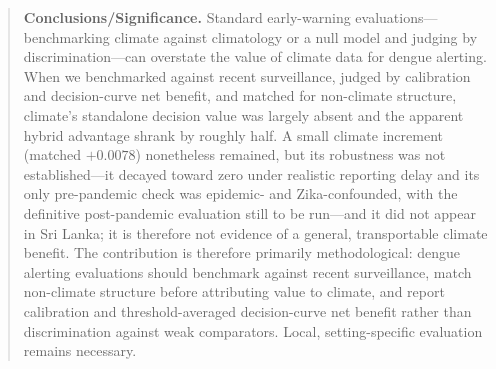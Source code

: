 \documentclass[11pt,a4paper]{article}
\begin{document}
\begin{abstract}
\noindent\textbf{Conclusions/Significance.}
Standard early-warning evaluations---benchmarking climate against climatology or a null model and judging by discrimination---can overstate the value of climate data for dengue alerting. When we benchmarked against recent surveillance, judged by calibration and decision-curve net benefit, and matched for non-climate structure, climate's standalone decision value was largely absent and the apparent hybrid advantage shrank by roughly half. A small climate increment (matched $+0.0078$) nonetheless remained, but its robustness was not established---it decayed toward zero under realistic reporting delay and its only pre-pandemic check was epidemic- and Zika-confounded, with the definitive post-pandemic evaluation still to be run---and it did not appear in Sri Lanka; it is therefore not evidence of a general, transportable climate benefit. The contribution is therefore primarily methodological: dengue alerting evaluations should benchmark against recent surveillance, match non-climate structure before attributing value to climate, and report calibration and threshold-averaged decision-curve net benefit rather than discrimination against weak comparators. Local, setting-specific evaluation remains necessary.
\end{abstract}

\end{document}
